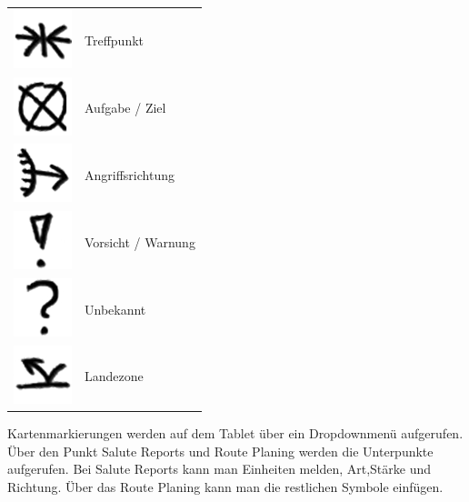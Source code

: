 \begin{longtable}{p{3cm} p{15cm}}
	\includegraphics[scale=1]{./img/fortgeschrittenes/karteUndMarkierungen/Treffpunkt.png} 		&		Treffpunkt \\
	\includegraphics[scale=1]{./img/fortgeschrittenes/karteUndMarkierungen/Aufgabe.png}		&		Aufgabe / Ziel \\
	\includegraphics[scale=1]{./img/fortgeschrittenes/karteUndMarkierungen/Angriffsrichtung.png}	& 		Angriffsrichtung \\
	\includegraphics[scale=1]{./img/fortgeschrittenes/karteUndMarkierungen/Achtung.png}		&		Vorsicht / Warnung \\
	\includegraphics[scale=1]{./img/fortgeschrittenes/karteUndMarkierungen/FrageUnbekannt.png}	& 		Unbekannt \\
	\includegraphics[scale=1]{./img/fortgeschrittenes/karteUndMarkierungen/LZ.png}			&		Landezone
\end{longtable}

\newpage

	Kartenmarkierungen werden auf dem Tablet über ein Dropdownmenü aufgerufen. Über den Punkt Salute Reports und Route Planing werden die Unterpunkte aufgerufen. Bei Salute Reports kann man Einheiten melden, Art,Stärke und Richtung. Über das Route Planing kann man die restlichen Symbole einfügen.

